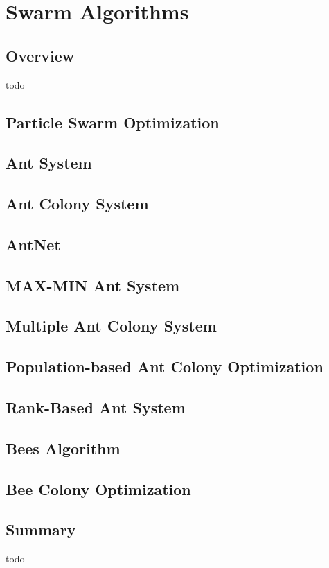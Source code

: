 \chapter{Swarm Algorithms}
\label{ch:swarm}

\section{Overview}
todo



\section{Particle Swarm Optimization}

\section{Ant System}
\section{Ant Colony System}
\section{AntNet}
\section{MAX-MIN Ant System}
\section{Multiple Ant Colony System}
\section{Population-based Ant Colony Optimization}
\section{Rank-Based Ant System}

\section{Bees Algorithm}
\section{Bee Colony Optimization}

\section{Summary}
todo
